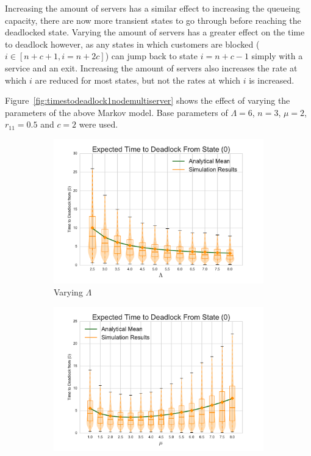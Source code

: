\documentclass{article}
\numberwithin{equation}{section}
\begin{document}
Increasing the amount of servers has a similar effect to increasing the queueing capacity, there are now more transient states to go through before reaching the deadlocked state.
Varying the amount of servers has a greater effect on the time to deadlock however, as any states in which customers are blocked ($i \in [n+c+1, i=n+2c]$) can jump back to state $i=n+c-1$ simply with a service and an exit.
Increasing the amount of servers also increases the rate at which $i$ are reduced for most states, but not the rates at which $i$ is increased.

Figure~\ref{fig:timestodeadlock1nodemultiserver} shows the effect of varying the parameters of the above Markov model.
Base parameters of $\Lambda = 6$, $n = 3$, $\mu = 2$, $r_{11} = 0.5$ and $c = 2$ were used.

\begin{figure}[!htbp]
  \begin{center}
  \begin{subfigure}[b]{0.35\textwidth}
    \includegraphics[width=\textwidth]{images/varyL_1Nms}
    \caption{Varying $\Lambda$}
    \label{fig:1Nms_L}
  \end{subfigure}
  \begin{subfigure}[b]{0.35\textwidth}
    \includegraphics[width=\textwidth]{images/varymu_1Nms}

\end{subfigure}
\end{center}
\end{figure}
\end{document}
